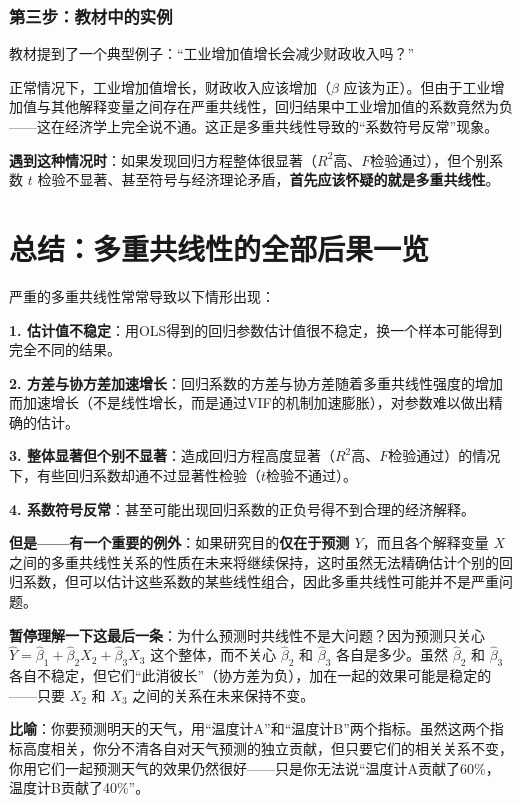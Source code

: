 \documentclass[12pt,a4paper]{ctexart}
\begin{document}
\subsubsection{第三步：教材中的实例}

教材提到了一个典型例子：“工业增加值增长会减少财政收入吗？”

正常情况下，工业增加值增长，财政收入应该增加（$\beta$ 应该为正）。但由于工业增加值与其他解释变量之间存在严重共线性，回归结果中工业增加值的系数竟然为负——这在经济学上完全说不通。这正是多重共线性导致的“系数符号反常”现象。

\textbf{遇到这种情况时}：如果发现回归方程整体很显著（$R^2$高、$F$检验通过），但个别系数 $t$ 检验不显著、甚至符号与经济理论矛盾，\textbf{首先应该怀疑的就是多重共线性}。

\section{总结：多重共线性的全部后果一览}

严重的多重共线性常常导致以下情形出现：

\textbf{1. 估计值不稳定}：用OLS得到的回归参数估计值很不稳定，换一个样本可能得到完全不同的结果。

\textbf{2. 方差与协方差加速增长}：回归系数的方差与协方差随着多重共线性强度的增加而加速增长（不是线性增长，而是通过VIF的机制加速膨胀），对参数难以做出精确的估计。

\textbf{3. 整体显著但个别不显著}：造成回归方程高度显著（$R^2$高、$F$检验通过）的情况下，有些回归系数却通不过显著性检验（$t$检验不通过）。

\textbf{4. 系数符号反常}：甚至可能出现回归系数的正负号得不到合理的经济解释。

\textbf{但是——有一个重要的例外}：如果研究目的\textbf{仅在于预测 $Y$}，而且各个解释变量 $X$ 之间的多重共线性关系的性质在未来将继续保持，这时虽然无法精确估计个别的回归系数，但可以估计这些系数的某些线性组合，因此多重共线性可能并不是严重问题。

\textbf{暂停理解一下这最后一条}：为什么预测时共线性不是大问题？因为预测只关心 $\hat{Y} = \hat{\beta}_1 + \hat{\beta}_2 X_2 + \hat{\beta}_3 X_3$ 这个整体，而不关心 $\hat{\beta}_2$ 和 $\hat{\beta}_3$ 各自是多少。虽然 $\hat{\beta}_2$ 和 $\hat{\beta}_3$ 各自不稳定，但它们“此消彼长”（协方差为负），加在一起的效果可能是稳定的——只要 $X_2$ 和 $X_3$ 之间的关系在未来保持不变。

\textbf{比喻}：你要预测明天的天气，用“温度计A”和“温度计B”两个指标。虽然这两个指标高度相关，你分不清各自对天气预测的独立贡献，但只要它们的相关关系不变，你用它们一起预测天气的效果仍然很好——只是你无法说“温度计A贡献了60\%，温度计B贡献了40\%”。
\end{document}

